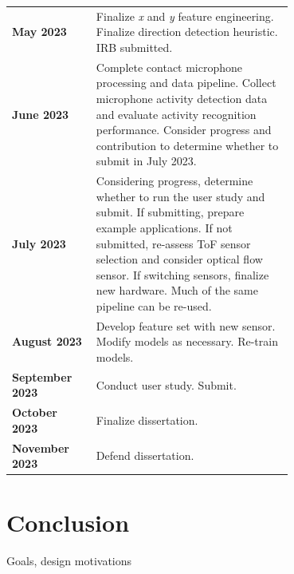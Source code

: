 \documentclass [11pt, proquest] {uwthesis}[2020/02/24]
\begin{document}


\vspace{2em}
\begin{tabular}{@{}lp{0.7\linewidth}@{}}
\textbf{May 2023} & Finalize \textit{x} and \textit{y} feature engineering. Finalize direction detection heuristic. IRB submitted. \\
\textbf{June 2023} & Complete contact microphone processing and data pipeline. Collect microphone activity detection data and evaluate activity recognition performance. Consider progress and contribution to determine whether to submit in July 2023. \\
\textbf{July 2023} & Considering progress, determine whether to run the user study and submit. If submitting, prepare example applications. If not submitted, re-assess ToF sensor selection and consider optical flow sensor. If switching sensors, finalize new hardware. Much of the same pipeline can be re-used. \\
\textbf{August 2023} & Develop feature set with new sensor. Modify models as necessary. Re-train models. \\
\textbf{September 2023} & Conduct user study. Submit. \\
\textbf{October 2023} & Finalize dissertation. \\
\textbf{November 2023} & Defend dissertation. \\
\end{tabular}




\chapter{Conclusion}

Goals, design motivations

%
%
\nocite{*}   %


%
%
 
 
 
\end{document}
